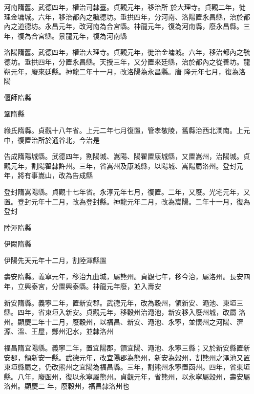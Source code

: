 \begin{pinyinscope}
 河南隋舊。武德四年，權治司隸臺。貞觀元年，移治所
 於大理寺。貞觀二年，徙理金墉城。六年，移治都內之毓德坊。垂拱四年，分河南、洛陽置永昌縣，治於都內之道德坊。永昌元年，改河南為合宮縣。神龍元年，復為河南縣，廢永昌縣。三年，復為合宮縣。景龍元年，復為河南縣



 洛陽隋舊。武德四年，權治大理寺。貞觀元年，徙治金墉城。六年，移治都內之毓德坊。垂拱四年，分置永昌縣。天授三年，又分置來廷縣，治於都內之從善坊。龍朔元年，廢來廷縣。神龍二年十一月，改洛陽為永昌縣。唐
 隆元年七月，復為洛陽



 偃師隋縣



 鞏隋縣



 緱氏隋縣。貞觀十八年省。上元二年七月復置，管孝敬陵，舊縣治西北澗南。上元中，復置治所於通谷北，今治是



 告成隋陽城縣。武德四年，割陽城、嵩陽、陽翟置康城縣，又置嵩州，治陽城。貞觀元年，割陽翟隸許州。三年，省嵩州及康城縣，以陽城、嵩陽屬洛州。登封元年，將有事嵩山，改為告成縣



 登封隋嵩陽縣。貞觀十七年省。永淳元年七月，復置。二年，又廢。光宅元年，又
 置。登封元年十二月，改為登封縣。神龍元年二月，改為嵩陽。二年十一月，復為登封



 陸渾隋縣



 伊闕隋縣



 伊陽先天元年十二月，割陸渾縣置



 壽安隋縣。義寧元年，移治九曲城，屬熊州。貞觀七年，移今治，屬洛州。長安四年，立興泰宮，分置興泰縣。神龍元年廢，並入壽安



 新安隋縣。義寧二年，置新安郡。武德元年，改為穀州，領新安、澠池、東垣三縣。四年，省東垣入新安。貞觀元年，移穀州治澠池，新安移入廢州城，改屬
 洛州。顯慶二年十二月，廢穀州，以福昌、新安、澠池、永寧，並懷州之河陽、濟源、溫、王屋，鄭州氾水，並隸洛州



 福昌隋宜陽縣。義寧二年，置宜陽郡，領宜陽、澠池、永寧三縣；又於新安縣置新安郡，領新安一縣。武德元年，改宜陽郡為熊州，新安為穀州，割熊州之澠池又置東垣縣屬之，仍改熊州之宜陽為福昌縣。三年，割熊州永寧置函州。四年，省東垣縣。八年，廢函州，復以永寧屬熊州。貞觀元年，省熊州，以永寧屬穀州，壽安屬洛州。顯慶二
 年，廢穀州，福昌隸洛州也




\end{pinyinscope}
